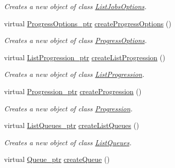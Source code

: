\begin{DoxyCompactItemize}
\begin{DoxyCompactList}\small\item\em Creates a new object of class \hyperlink{classTMS__Data_1_1ListJobsOptions}{ListJobsOptions}. \item\end{DoxyCompactList}\item 
virtual \hyperlink{classTMS__Data_1_1ProgressOptions}{ProgressOptions\_\-ptr} \hyperlink{classTMS__Data_1_1TMS__DataFactory_a7ea7041d8cbd11f9df3b7445d75be57a}{createProgressOptions} ()
\begin{DoxyCompactList}\small\item\em Creates a new object of class \hyperlink{classTMS__Data_1_1ProgressOptions}{ProgressOptions}. \item\end{DoxyCompactList}\item 
virtual \hyperlink{classTMS__Data_1_1ListProgression}{ListProgression\_\-ptr} \hyperlink{classTMS__Data_1_1TMS__DataFactory_a62797620fea843da12d21d1e2d188b7d}{createListProgression} ()
\begin{DoxyCompactList}\small\item\em Creates a new object of class \hyperlink{classTMS__Data_1_1ListProgression}{ListProgression}. \item\end{DoxyCompactList}\item 
virtual \hyperlink{classTMS__Data_1_1Progression}{Progression\_\-ptr} \hyperlink{classTMS__Data_1_1TMS__DataFactory_aa04017d9392a3368d981dc29b514b169}{createProgression} ()
\begin{DoxyCompactList}\small\item\em Creates a new object of class \hyperlink{classTMS__Data_1_1Progression}{Progression}. \item\end{DoxyCompactList}\item 
virtual \hyperlink{classTMS__Data_1_1ListQueues}{ListQueues\_\-ptr} \hyperlink{classTMS__Data_1_1TMS__DataFactory_aebbe1271bd1aaa7afa43428873d7f8f0}{createListQueues} ()
\begin{DoxyCompactList}\small\item\em Creates a new object of class \hyperlink{classTMS__Data_1_1ListQueues}{ListQueues}. \item\end{DoxyCompactList}\item 
virtual \hyperlink{classTMS__Data_1_1Queue}{Queue\_\-ptr} \hyperlink{classTMS__Data_1_1TMS__DataFactory_a19f652bfb4cd1172e85a11d618410dde}{createQueue} ()

\end{DoxyCompactItemize}

